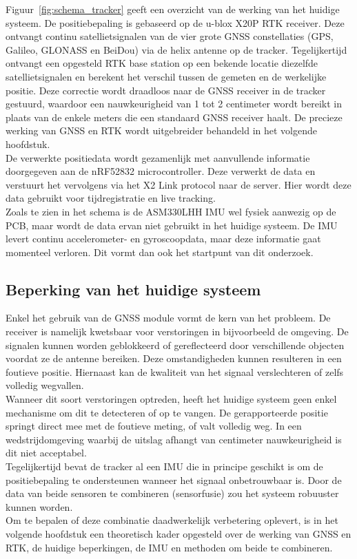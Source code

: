 Figuur~\ref{fig:schema_tracker} geeft een overzicht van de werking van het huidige systeem. De positiebepaling is gebaseerd op de u-blox X20P RTK receiver. Deze ontvangt continu satellietsignalen van de vier grote GNSS constellaties (GPS, Galileo, GLONASS en BeiDou) via de helix antenne op de tracker. Tegelijkertijd ontvangt een opgesteld RTK base station op een bekende locatie diezelfde satellietsignalen en berekent het verschil tussen de gemeten en de werkelijke positie. Deze correctie wordt draadloos naar de GNSS receiver in de tracker gestuurd, waardoor een nauwkeurigheid van 1 tot 2 centimeter wordt bereikt in plaats van de enkele meters die een standaard GNSS receiver haalt. De precieze werking van GNSS en RTK wordt uitgebreider behandeld in het volgende hoofdstuk. \\


De verwerkte positiedata wordt gezamenlijk met aanvullende informatie doorgegeven aan de nRF52832 microcontroller. Deze verwerkt de data en verstuurt het vervolgens via het X2 Link protocol naar de server. Hier wordt deze data gebruikt voor tijdregistratie en live tracking. \\

Zoals te zien in het schema is de ASM330LHH IMU wel fysiek aanwezig op de PCB, maar wordt de data ervan niet gebruikt in het huidige systeem. De IMU levert continu accelerometer- en gyroscoopdata, maar deze informatie gaat momenteel verloren. Dit vormt dan ook het startpunt van dit onderzoek.


\subsection{Beperking van het huidige systeem}

Enkel het gebruik van de GNSS module vormt de kern van het probleem. De receiver is namelijk kwetsbaar voor verstoringen in bijvoorbeeld de omgeving. De signalen kunnen worden geblokkeerd of gereflecteerd door verschillende objecten voordat ze de antenne bereiken.  Deze omstandigheden kunnen resulteren in een foutieve positie. Hiernaast kan de kwaliteit van het signaal verslechteren of zelfs volledig wegvallen. \\

Wanneer dit soort verstoringen optreden, heeft het huidige systeem geen enkel mechanisme om dit te detecteren of op te vangen. De gerapporteerde positie springt direct mee met de foutieve meting, of valt volledig weg. In een wedstrijdomgeving waarbij de uitslag afhangt van centimeter nauwkeurigheid is dit niet acceptabel. \\

Tegelijkertijd bevat de tracker al een IMU die in principe geschikt is om de positiebepaling te ondersteunen wanneer het signaal onbetrouwbaar is. Door de data van beide sensoren te combineren (sensorfusie) zou het systeem robuuster kunnen worden. \\

Om te bepalen of deze combinatie daadwerkelijk verbetering oplevert, is in het volgende hoofdstuk een theoretisch kader opgesteld over de werking van GNSS en RTK, de huidige beperkingen, de IMU en methoden om beide te combineren. \\

\newpage